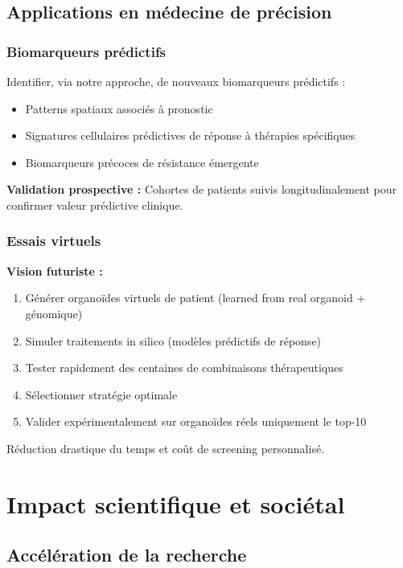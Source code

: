 \subsection{Applications en médecine de précision}

\subsubsection{Biomarqueurs prédictifs}

Identifier, via notre approche, de nouveaux biomarqueurs prédictifs :
\begin{itemize}
    \item Patterns spatiaux associés à pronostic
    \item Signatures cellulaires prédictives de réponse à thérapies spécifiques
    \item Biomarqueurs précoces de résistance émergente
\end{itemize}

\textbf{Validation prospective :}
Cohortes de patients suivis longitudinalement pour confirmer valeur prédictive clinique.

\subsubsection{Essais virtuels}

\textbf{Vision futuriste :}
\begin{enumerate}
    \item Générer organoïdes virtuels de patient (learned from real organoid + génomique)
    \item Simuler traitements in silico (modèles prédictifs de réponse)
    \item Tester rapidement des centaines de combinaisons thérapeutiques
    \item Sélectionner stratégie optimale
    \item Valider expérimentalement sur organoïdes réels uniquement le top-10
\end{enumerate}

Réduction drastique du temps et coût de screening personnalisé.

\section{Impact scientifique et sociétal}

\subsection{Accélération de la recherche}

